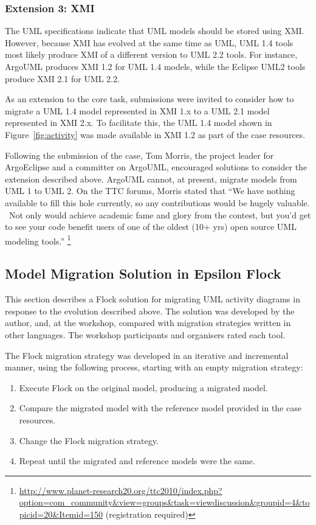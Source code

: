 \subsubsection{Extension 3: XMI}
\label{sub:xmi}
The UML specifications \cite{uml14,uml22} indicate that UML models should be stored using XMI. However, because XMI has evolved at the same time as UML, UML 1.4 tools most likely produce XMI of a different version to UML 2.2 tools. For instance, ArgoUML produces XMI 1.2 for UML 1.4 models, while the Eclipse UML2 tools produce XMI 2.1 for UML 2.2.

As an extension to the core task, submissions were invited to consider how to migrate a UML 1.4 model represented in XMI 1.x to a UML 2.1 model represented in XMI 2.x. To facilitate this, the UML 1.4 model shown in Figure~\ref{fig:activity} was made available in XMI 1.2 as part of the case resources.

Following the submission of the case, Tom Morris, the project leader for ArgoEclipse and a committer on ArgoUML, encouraged solutions to consider the extension described above. ArgoUML cannot, at present, migrate models from UML 1 to UML 2.  On the TTC forums, Morris stated that ``We have nothing available to fill this hole currently, so any contributions would be hugely valuable.  Not only would achieve academic fame and glory from the contest, but you'd get to see your code benefit users of one of the oldest (10+ yrs) open source UML modeling tools.'' \footnote{\url{http://www.planet-research20.org/ttc2010/index.php?option=com_community&view=groups&task=viewdiscussion&groupid=4&topicid=20&Itemid=150} (registration required)}

\subsection{Model Migration Solution in Epsilon Flock}
\label{subsec:ttc_solution}
This section describes a Flock solution for migrating UML activity diagrams in response to the evolution described above. The solution was developed by the author, and, at the workshop, compared with migration strategies written in other languages. The workshop participants and organisers rated each tool.

The Flock migration strategy was developed in an iterative and incremental manner, using the following process, starting with an empty migration strategy:

\begin{enumerate}
	\item Execute Flock on the original model, producing a migrated model.
	\item Compare the migrated model with the reference model provided in the case resources.
	\item Change the Flock migration strategy.
	\item Repeat until the migrated and reference models were the same.
\end{enumerate}

